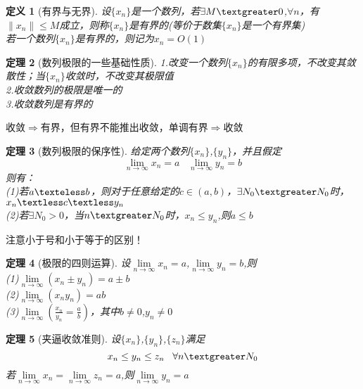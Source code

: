 \documentclass[12pt, a4paper, oneside]{ctexart}
\newtheorem{theorem}{定理}[section]
\newtheorem{definition}[theorem]{定义}
\begin{document}
\begin{definition}[有界与无界]
设$\{x_n\}$是一个数列，若$\exists M \textgreater 0$,$\forall n$，有$\|x_n\| \leq M$成立，则称$\{x_n\}$是有界的(等价于数集$\{x_n\}$是一个有界集)\\
若一个数列$\{x_n\}$是有界的，则记为$x_n=O(1)$
\end{definition}

\begin{theorem}[数列极限的一些基础性质]
1.改变一个数列$\{x_n\}$的有限多项，不改变其敛散性；当$\{x_n\}$收敛时，不改变其极限值\\
2.收敛数列的极限是唯一的\\
3.收敛数列是有界的
\end{theorem}

\begin{note}
收敛$\Rightarrow$有界，但有界不能推出收敛，单调有界$\Rightarrow$收敛
\end{note}

\begin{theorem}[数列极限的保序性]
给定两个数列$\{x_n\}$,$\{y_n\}$，并且假定
\begin{equation*}
    \lim\limits_{n\to \infty}x_n=a\;\;\;\lim\limits_{n\to \infty}y_n=b
\end{equation*}
则有：\\
(1)若$a\texteless b$，则对于任意给定的$c\in(a,b)$，$\exists N_0 \textgreater N_0$时，$x_n  \textless c \textless y_n$\\
(2)若$\exists N_0 >0$，当$n \textgreater N_0$时，$x_n \leq y_n$,则$a \leq b$
\end{theorem}

\begin{remark}
注意小于号和小于等于的区别！
\end{remark}

\begin{theorem}[极限的四则运算]
设$\lim\limits_{n\to \infty}x_n=a$,$\lim\limits_{n\to \infty}y_n=b$,则\\
(1)$\lim\limits_{n\to \infty}(x_n \pm y_n)=a\pm b$\\
(2)$\lim\limits_{n\to \infty}(x_n y_n)=ab$\\
(3)$\lim\limits_{n\to \infty}(\frac{x_n}{y_n}=\frac{a}{b})$，其中$b \neq 0$,$y_n\neq 0$

\end{theorem}

\begin{theorem}[夹逼收敛准则]
设$\{x_n\}$,$\{y_n\}$,$\{z_n\}$满足
\begin{equation*}
    x_n \leq y_n \leq z_n\;\;\; \forall n \textgreater  N_0
\end{equation*}
若$\lim\limits_{n\to \infty}x_n=\lim\limits_{n\to \infty}z_n=a$,则$\lim\limits_{n\to \infty}y_n=a$
\end{theorem}
\end{document}
